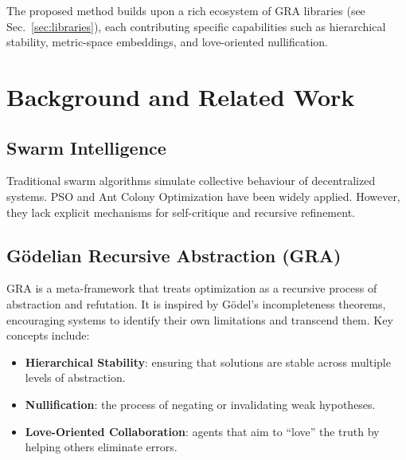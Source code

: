 \documentclass[12pt,a4paper]{article}
\begin{document}
The proposed method builds upon a rich ecosystem of GRA libraries (see Sec.~\ref{sec:libraries}), each contributing specific capabilities such as hierarchical stability, metric-space embeddings, and love-oriented nullification.

\section{Background and Related Work}
\subsection{Swarm Intelligence}
Traditional swarm algorithms simulate collective behaviour of decentralized systems. PSO \cite{kennedy1995particle} and Ant Colony Optimization \cite{dorigo1999ant} have been widely applied. However, they lack explicit mechanisms for self-critique and recursive refinement.

\subsection{Gödelian Recursive Abstraction (GRA)}
GRA is a meta-framework that treats optimization as a recursive process of abstraction and refutation. It is inspired by Gödel's incompleteness theorems, encouraging systems to identify their own limitations and transcend them. Key concepts include:
\begin{itemize}
    \item \textbf{Hierarchical Stability}: ensuring that solutions are stable across multiple levels of abstraction.
    \item \textbf{Nullification}: the process of negating or invalidating weak hypotheses.
    \item \textbf{Love-Oriented Collaboration}: agents that aim to ``love'' the truth by helping others eliminate errors.
\end{itemize}
\end{document}
